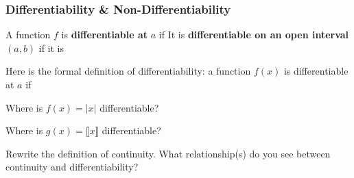 \documentclass[notes]{subfiles}
\begin{document}
	\subsubsection*{Differentiability \& Non-Differentiability}
		\begin{defn}[Differentiability]
			A function $f$ is \textbf{differentiable at }$a$ if 
			It is \textbf{differentiable on an open interval} $(a,b)$ if it is 
		\end{defn}
		\begin{rmk}[A Note]
			Here is the formal definition of differentiability: a function $f(x)$ is differentiable at $a$ if 
		\end{rmk}
			\newpage
			
		\begin{ex}
			Where is $f(x) = |x|$ differentiable?
		\end{ex}
			
		\begin{ex}
			Where is $g(x) = \llbracket x\rrbracket$ differentiable?
		\end{ex}	

		\begin{question}
			Rewrite the definition of continuity.  What relationship(s) do you see between continuity and differentiability?
		\end{question}
			
		\begin{rmk}
		\end{rmk}
			\newpage
			
\end{document}
